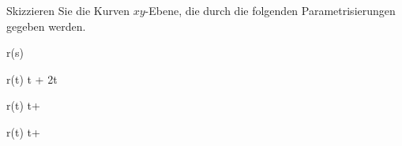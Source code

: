 \begin{atiTask}[
  title = Parametrisierung gegeben, Kurve gesucht
]
  Skizzieren Sie die Kurven $xy$-Ebene, die durch die folgenden Parametrisierungen gegeben werden.
  \begin{atiSubequations}
    \item{
      \separate
      r(s)  {}
    }
    \item{
      \separate
      r(t) \cos t \vectorX + 2\sin t \vectorY
    }
    \item{
      \separate
      r(t)  t\vectorX + \vectorY
    }
    \item{
      \separate
      r(t)  t\vectorX + \vectorY
    }
  \end{atiSubequations}
\end{atiTask}